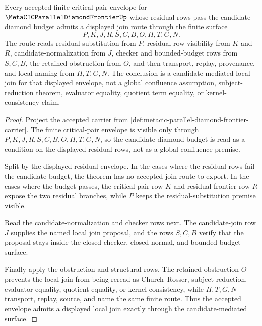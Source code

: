 \begin{theorem}
\label{thm:metacic-parallel-diamond-frontier-critical-pair-join}
Every accepted finite critical-pair envelope for $\MetaCICParallelDiamondFrontierUp$ whose residual rows pass the candidate diamond budget admits a displayed join route through the finite surface
$$
P,K,J,R,S,C,B,O,H,T,G,N .
$$
The route reads residual substitution from $P$, residual-row visibility from $K$ and $R$, candidate-normalization from $J$, checker and bounded-budget rows from $S,C,B$, the retained obstruction from $O$, and then transport, replay, provenance, and local naming from $H,T,G,N$. The conclusion is a candidate-mediated local join for that displayed envelope, not a global confluence assumption, subject-reduction theorem, evaluator equality, quotient term equality, or kernel-consistency claim.
\end{theorem}
\begin{proof}
Project the accepted carrier from \autoref{def:metacic-parallel-diamond-frontier-carrier}. The finite critical-pair envelope is visible only through $P,K,J,R,S,C,B,O,H,T,G,N$, so the candidate diamond budget is read as a condition on the displayed residual rows, not as a global confluence premise.

Split by the displayed residual envelope. In the cases where the residual rows fail the candidate budget, the theorem has no accepted join route to export. In the cases where the budget passes, the critical-pair row $K$ and residual-frontier row $R$ expose the two residual branches, while $P$ keeps the residual-substitution premise visible.

Read the candidate-normalization and checker rows next. The candidate-join row $J$ supplies the named local join proposal, and the rows $S,C,B$ verify that the proposal stays inside the closed checker, closed-normal, and bounded-budget surface.

Finally apply the obstruction and structural rows. The retained obstruction $O$ prevents the local join from being reread as Church--Rosser, subject reduction, evaluator equality, quotient equality, or kernel consistency, while $H,T,G,N$ transport, replay, source, and name the same finite route. Thus the accepted envelope admits a displayed local join exactly through the candidate-mediated surface.
\end{proof}
